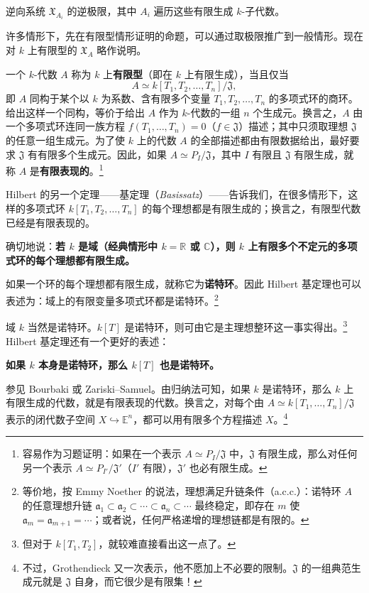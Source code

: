 逆向系统 $\mathfrak X_{A_i}$ 的逆极限，其中 $A_i$ 遍历这些有限生成 $k$-子代数。

许多情形下，先在有限型情形证明的命题，可以通过取极限推广到一般情形。现在对 $k$ 上有限型的 $\mathfrak X_A$ 略作说明。

一个 $k$-代数 $A$ 称为 $k$ 上\textbf{有限型}（即在 $k$ 上有限生成），当且仅当
\[
A\simeq k[T_1,T_2,\ldots,T_n]/\mathfrak J,
\]
即 $A$ 同构于某个以 $k$ 为系数、含有限多个变量 $T_1,T_2,\ldots,T_n$ 的多项式环的商环。给出这样一个同构，等价于给出 $A$ 作为 $k$-代数的一组 $n$ 个生成元。换言之，$A$ 由一个多项式环连同一族方程 $f(T_1,\ldots,T_n)=0$（$f\in\mathfrak J$）描述；其中只须取理想 $\mathfrak J$ 的任意一组生成元。为了使 $k$ 上的代数 $A$ 的全部描述都由有限数据给出，最好要求 $\mathfrak J$ 有有限多个生成元。因此，如果 $A\simeq P_I/\mathfrak J$，其中 $I$ 有限且 $\mathfrak J$ 有限生成，就称 $A$ 是\textbf{有限表现的}。\footnote{容易作为习题证明：如果在一个表示 $A\simeq P_I/\mathfrak J$ 中，$\mathfrak J$ 有限生成，那么对任何另一个表示 $A\simeq P_{I'}/\mathfrak J'$（$I'$ 有限），$\mathfrak J'$ 也必有限生成。}

Hilbert 的另一个定理——基定理（\textit{Basissatz}）——告诉我们，在很多情形下，这样的多项式环 $k[T_1,T_2,\ldots,T_n]$ 的每个理想都是有限生成的；换言之，有限型代数已经是有限表现的。

确切地说：\textbf{若 $k$ 是域（经典情形中 $k=\mathbb R$ 或 $\mathbb C$），则 $k$ 上有限多个不定元的多项式环的每个理想都有限生成。}

如果一个环的每个理想都有限生成，就称它为\textbf{诺特环}。因此 Hilbert 基定理也可以表述为：域上的有限变量多项式环都是诺特环。\footnote{等价地，按 Emmy Noether 的说法，理想满足升链条件（a.c.c.）：诺特环 $A$ 的任意理想升链 $\mathfrak a_1\subset\mathfrak a_2\subset\cdots\subset\mathfrak a_n\subset\cdots$ 最终稳定，即存在 $m$ 使 $\mathfrak a_m=\mathfrak a_{m+1}=\cdots$；或者说，任何严格递增的理想链都是有限的。}

域 $k$ 当然是诺特环。$k[T]$ 是诺特环，则可由它是主理想整环这一事实得出。\footnote{但对于 $k[T_1,T_2]$，就较难直接看出这一点了。}
Hilbert 基定理还有一个更好的表述：

\textbf{如果 $k$ 本身是诺特环，那么 $k[T]$ 也是诺特环。}

参见 Bourbaki 或 Zariski--Samuel。由归纳法可知，如果 $k$ 是诺特环，那么 $k$ 上有限生成的代数，就是有限表现的代数。换言之，对每个由 $A\simeq k[T_1,\ldots,T_n]/\mathfrak J$ 表示的闭代数子空间 $X\hookrightarrow\mathbb E^n$，都可以用有限多个方程描述 $X$。\footnote{不过，Grothendieck 又一次表示，他不愿加上不必要的限制。$\mathfrak J$ 的一组典范生成元就是 $\mathfrak J$ 自身，而它很少是有限集！}

